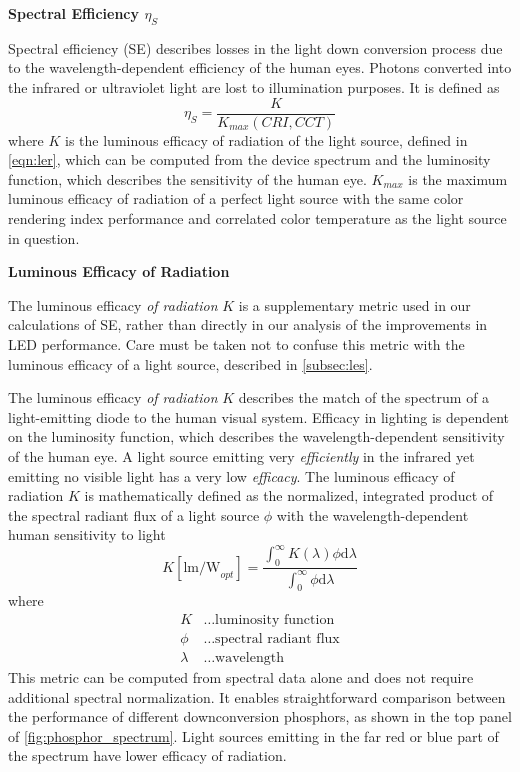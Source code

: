 \documentclass[parskip=full]{article}
\begin{document}
\textbf{Spectral Efficiency $\eta_{S}$}

Spectral efficiency (SE) describes losses in the light down conversion process due to the wavelength-dependent efficiency of the human eyes. Photons converted into the infrared or ultraviolet light are lost to illumination purposes. It is defined as
%
\begin{equation}
    \eta_{S} = \frac{K}{K_{max}(CRI,CCT)}
\end{equation}
%
where $K$ is the luminous efficacy of radiation of the light source, defined in \cref{eqn:ler}, which can be computed from the device spectrum and the luminosity function, which describes the sensitivity of the human eye. $K_{max}$ is the maximum luminous efficacy of radiation of a perfect light source with the same color rendering index performance and correlated color temperature as the light source in question\cite{schubert2018light}\cite{tsao2010solid}.

\textbf{Luminous Efficacy of Radiation}
\label{subsec:ler}

The luminous efficacy \textit{of radiation} $K$ is a supplementary metric used in our calculations of SE, rather than directly in our analysis of the improvements in LED performance. Care must be taken not to confuse this metric with the luminous efficacy of a light source, described in \cref{subsec:les}.

The luminous efficacy \textit{of radiation} $K$ describes the match of the spectrum of a light-emitting diode to the human visual system. Efficacy in lighting is dependent on the luminosity function, which describes the wavelength-dependent sensitivity of the human eye. A light source emitting very \textit{efficiently} in the infrared yet emitting no visible light has a very low \textit{efficacy}. The luminous efficacy of radiation $K$ is mathematically defined as the normalized, integrated product of the spectral radiant flux of a light source $\phi$ with the wavelength-dependent human sensitivity to light \cite{cie-term-effrad}
%
\begin{equation}
\label{eqn:ler}
    K [\text{lm/W}_{opt}]= \frac{\int_0^\infty K( \lambda ) \phi \text{d} \lambda}{\int_0^\infty \phi \text{d} \lambda}
\end{equation}
%
where
%
\begin{align*}
    K &\dots \text{luminosity function} \\
    \phi &\dots \text{spectral radiant flux} \\
    \lambda &\dots \text{wavelength}
\end{align*}
%
This metric can be computed from spectral data alone and does not require additional spectral normalization. It enables straightforward comparison between the performance of different downconversion phosphors, as shown in the top panel of \cref{fig:phosphor_spectrum}. Light sources emitting in the far red or blue part of the spectrum have lower efficacy of radiation.
\end{document}
